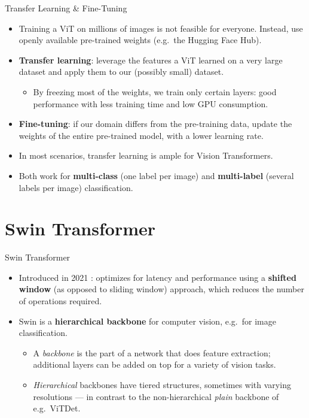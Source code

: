 \begin{frame}{Transfer Learning \& Fine-Tuning}
\begin{itemize}
  \item Training a ViT on millions of images is not feasible for everyone. Instead, use openly available pre-trained weights (e.g.\ the Hugging Face Hub).
  \item \textbf{Transfer learning}: leverage the features a ViT learned on a very large dataset and apply them to our (possibly small) dataset.
  \begin{itemize}
    \item By freezing most of the weights, we train only certain layers: good performance with less training time and low GPU consumption.
  \end{itemize}
  \item \textbf{Fine-tuning}: if our domain differs from the pre-training data, update the weights of the entire pre-trained model, with a lower learning rate.
  \item In most scenarios, transfer learning is ample for Vision Transformers.
  \item Both work for \textbf{multi-class} (one label per image) and \textbf{multi-label} (several labels per image) classification.
\end{itemize}
\end{frame}

\section{Swin Transformer}

\begin{frame}{Swin Transformer}
\begin{itemize}
  \item Introduced in 2021 : optimizes for latency and performance using a \textbf{shifted window} (as opposed to sliding window) approach, which reduces the number of operations required.
  \item Swin is a \textbf{hierarchical backbone} for computer vision, e.g.\ for image classification.
  \begin{itemize}
    \item A \textit{backbone} is the part of a network that does feature extraction; additional layers can be added on top for a variety of vision tasks.
    \item \textit{Hierarchical} backbones have tiered structures, sometimes with varying resolutions --- in contrast to the non-hierarchical \textit{plain} backbone of e.g.\ ViTDet.
  \end{itemize}
\end{itemize}
\end{frame}

